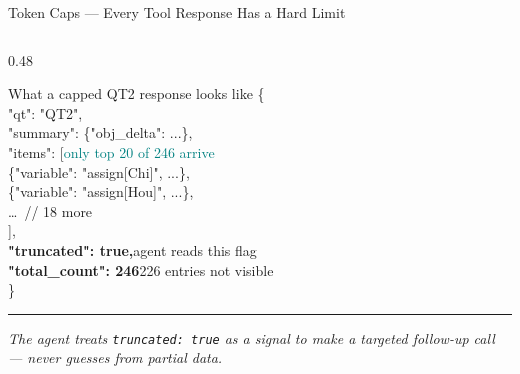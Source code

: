 \documentclass[aspectratio=169,10pt]{beamer}
\begin{document}
\begin{frame}[t]{Token Caps — Every Tool Response Has a Hard Limit}
\begin{columns}[T]
\begin{column}{0.48\textwidth}
\begin{block}{What a capped QT2 response looks like}
{        \{\\
        \quad "qt": "QT2",\\
        \quad "summary": \{"obj\_delta": ...\},\\[3pt]
        \quad "items": [\hfill\textcolor{teal}{\tiny only top 20 of 246 arrive}\\
        \quad\quad \{"variable": "assign[Chi]", ...\},\\
        \quad\quad \{"variable": "assign[Hou]", ...\},\\
        \quad\quad \ldots\ \textcolor{mgray}{// 18 more}\\
        \quad ],\\[5pt]
        \quad \textcolor{ared}{\bfseries "truncated": true,}\hfill\textcolor{ared}{\tiny agent reads this flag}\\
        \quad \textcolor{ared}{\bfseries "total\_count": 246}\hfill\textcolor{ared}{\tiny 226 entries not visible}\\
        \}
      }
    \end{block}
    \vspace{5pt}
    \textcolor{aorng}{\rule[0.4ex]{0.25cm}{0.7pt}}\;
    \textcolor{aorng}{\scriptsize\textit{The agent treats \texttt{truncated: true} as a signal
    to make a targeted follow-up call — never guesses from partial data.}}
  \end{column}
\end{columns}
\end{frame}
\end{document}
